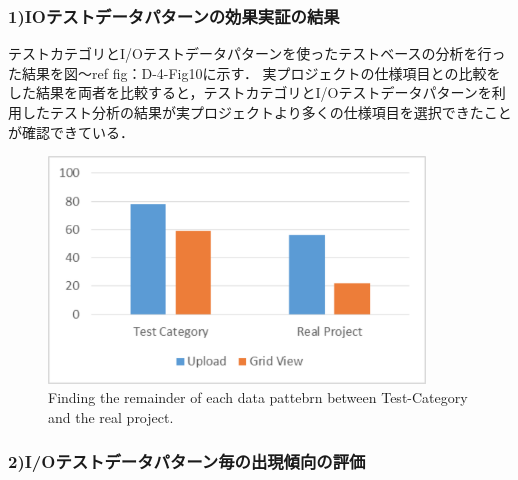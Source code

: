 \documentclass[a4paper,12pt]{jreport}
\begin{document}
\subsubsection{1)IOテストデータパターンの効果実証の結果}
テストカテゴリとI/Oテストデータパターンを使ったテストベースの分析を行った結果を図〜ref {fig：D-4-Fig10}に示す．
実プロジェクトの仕様項目との比較をした結果を両者を比較すると，テストカテゴリとI/Oテストデータパターンを利用したテスト分析の結果が実プロジェクトより多くの仕様項目を選択できたことが確認できている．
   \begin{figure}[htbp]
  \begin{center}
  \includegraphics[width=10cm]{./image/D-4-Fig10.png}
  \caption{Finding the remainder of each data pattebrn between Test-Category and the real project.}
  \label{fig:D-4-Fig10}
  \end{center}
   \end{figure}

\subsubsection{2)I/Oテストデータパターン毎の出現傾向の評価}
\end{document}
